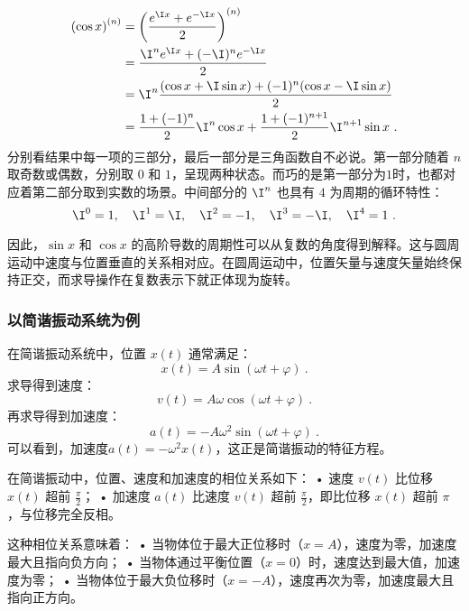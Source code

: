 \begin{equation}
\begin{split}
\left( \cos x \right)^{(n)} &= \left( \frac{e^{\I x} + e^{-\I x}}{2} \right)^{(n)}\\
&=\frac{\I^n e^{\I x} + (-\I)^n e^{-\I x}}{2}\\
&=\I^{n} \frac{(\cos x+\I\sin x) + (-1)^{n}(\cos x-\I\sin x )}{2}\\
&=\frac{1+(-1)^{n}}{2}\I^{n} \cos x+\frac{1+(-1)^{n+1}}{2}\I^{n+1} \sin x~.
\end{split}
\end{equation}
分别看结果中每一项的三部分，最后一部分是三角函数自不必说。第一部分随着 $n$ 取奇数或偶数，分别取 $0$ 和 $1$，呈现两种状态。而巧的是第一部分为$1$时，也都对应着第二部分取到实数的场景。中间部分的 $\I^n$ 也具有 $4$ 为周期的循环特性：
\begin{equation}
\I^0 = 1, \quad \I^1 = \I, \quad \I^2 = -1, \quad \I^3 = -\I, \quad \I^4 = 1~.
\end{equation}

因此，$\sin x$ 和 $\cos x$ 的高阶导数的周期性可以从复数的角度得到解释。这与圆周运动中速度与位置垂直的关系相对应。在圆周运动中，位置矢量与速度矢量始终保持正交，而求导操作在复数表示下就正体现为旋转。

\subsubsection{以简谐振动系统为例}

在简谐振动系统中，位置 $x(t)$ 通常满足：
\begin{equation}
x(t) = A \sin(\omega t + \varphi)~.
\end{equation}
求导得到速度：
\begin{equation}
v(t) = A\omega \cos(\omega t + \varphi)~.
\end{equation}
再求导得到加速度：
\begin{equation}
a(t) = -A\omega^2 \sin(\omega t + \varphi)~.
\end{equation}
可以看到，加速度$a(t) = -\omega^2 x(t)$，这正是简谐振动的特征方程。

在简谐振动中，位置、速度和加速度的相位关系如下：
	•	速度 $v(t)$ 比位移 $x(t)$ 超前 $\frac{\pi}{2}$；
	•	加速度 $a(t)$ 比速度 $v(t)$ 超前 $\frac{\pi}{2}$，即比位移 $x(t)$ 超前 $\pi$，与位移完全反相。

这种相位关系意味着：
	•	当物体位于最大正位移时（$x = A$），速度为零，加速度最大且指向负方向；
	•	当物体通过平衡位置（$x = 0$）时，速度达到最大值，加速度为零；
	•	当物体位于最大负位移时（$x = -A$），速度再次为零，加速度最大且指向正方向。

